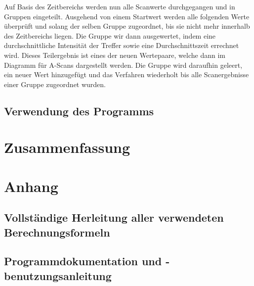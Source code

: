 \documentclass[reducespace,stylepage,semiarbeit]{spezidoc}
\begin{document}
Auf Basis des Zeitbereichs werden nun alle Scanwerte durchgegangen und in Gruppen eingeteilt. 
Ausgehend von einem Startwert werden alle folgenden Werte überprüft und solang der selben Gruppe zugeordnet, bis sie nicht mehr innerhalb des Zeitbereichs liegen. 
Die Gruppe wir dann ausgewertet, indem eine durchschnittliche Intensität der Treffer sowie eine Durchschnittszeit errechnet wird. 
Dieses Teilergebnis ist eines der neuen Wertepaare, welche dann im Diagramm für A-Scans dargestellt werden. 
Die Gruppe wird daraufhin geleert, ein neuer Wert hinzugefügt und das Verfahren wiederholt bis alle Scanergebnisse einer Gruppe zugeordnet wurden.


\subsection{Verwendung des Programms} %


\newpage
\section{Zusammenfassung}



\newpage
\section{Anhang}

\subsection{Vollständige Herleitung aller verwendeten Berechnungsformeln}

\subsection{Programmdokumentation und -benutzungsanleitung}



\eidesstattlicheerklaerung
\end{document}
